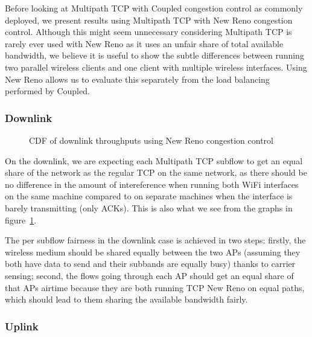 Before looking at Multipath TCP with Coupled congestion control as commonly
deployed, we present results using Multipath TCP with New Reno congestion
control. Although this might seem unnecessary considering Multipath TCP is
rarely ever used with New Reno as it uses an unfair share of total available
bandwidth, we believe it is useful to show the subtle differences between
running two parallel wireless clients and one client with multiple wireless
interfaces. Using New Reno allows us to evaluate this separately from the
load balancing performed by Coupled.

\subsubsection{Downlink}
\label{sec:results-mptcp-down}

\begin{figure}[h]
 \centering
 \subfloat[][2.4 GHz, disparate channel] {\
 }
 \subfloat[][5 and 2.4 GHz] {\
 }

 \caption{CDF of downlink throughputs using New Reno congestion control}\label{graph:reno-down}
\end{figure}

On the downlink, we are expecting each Multipath TCP subflow to get an equal
share of the network as the regular TCP on the same network, as there should be
no difference in the amount of intereference when running both WiFi interfaces
on the same machine compared to on separate machines when the interface is
barely transmitting (only ACKs). This is also what we see from the graphs in
figure~\ref{graph:reno-down}.

The per subflow fairness in the downlink case is achieved in two steps: firstly,
the wireless medium should be shared equally between the two APs (assuming they
both have data to send and their subbands are equally busy) thanks to carrier
sensing; second, the flows going through each AP should get an equal share of
that APs airtime because they are both running TCP New Reno on equal paths,
which should lead to them sharing the available bandwidth fairly.

\subsubsection{Uplink}
\label{sec:results-mptcp-up}

